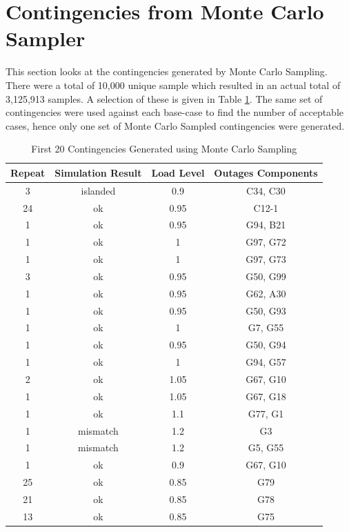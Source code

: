 \documentclass[a4paper,oneside,12pt]{report}
\begin{document}
\section{Contingencies from Monte Carlo Sampler}

This section looks at the contingencies generated by Monte Carlo Sampling. There were a total of 10,000 unique sample which resulted in an actual total of 3,125,913 samples. A selection of these is given in Table \ref{table_contingencies}. The same set of contingencies were used against each base-case to find the number of acceptable cases, hence only one set of Monte Carlo Sampled contingencies were generated.

\begin{table}[htbp]
\caption{First 20 Contingencies Generated using Monte Carlo Sampling}
\label{table_contingencies}
\centering
\begin{tabular}{c||c||c||c}
\bfseries Repeat & \bfseries Simulation Result & \bfseries Load Level & \bfseries Outages Components \\
\hline \hline
3 & islanded & 0.9 & C34, C30 \\ 
24 & ok & 0.95 & C12-1  \\ 
1 & ok & 0.95 & G94, B21 \\ 
1 & ok & 1 & G97, G72 \\ 
1 & ok & 1 & G97, G73 \\ 
3 & ok & 0.95 & G50, G99 \\ 
1 & ok & 0.95 & G62, A30 \\ 
1 & ok & 0.95 & G50, G93 \\ 
1 & ok & 1 & G7, G55 \\ 
1 & ok & 0.95 & G50, G94 \\ 
1 & ok & 1 & G94, G57 \\ 
2 & ok & 1.05 & G67, G10 \\ 
1 & ok & 1.05 & G67, G18 \\ 
1 & ok & 1.1 & G77, G1 \\ 
1 & mismatch & 1.2 & G3  \\ 
1 & mismatch & 1.2 & G5, G55 \\ 
1 & ok & 0.9 & G67, G10 \\ 
25 & ok & 0.85 & G79  \\ 
21 & ok & 0.85 & G78  \\ 
13 & ok & 0.85 & G75  \\ 
\hline
\end{tabular}\\
\end{table}
\end{document}
